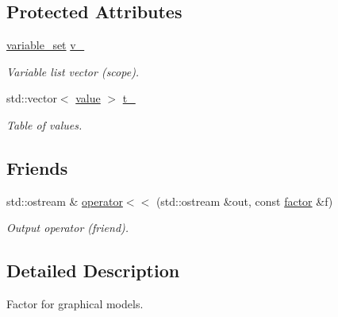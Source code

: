 \subsection*{Protected Attributes}
\begin{DoxyCompactItemize}
\item 
\hyperlink{classmerlin_1_1variable__set}{variable\+\_\+set} \hyperlink{classmerlin_1_1factor_a26c12d26a74f9bf173cc231bee6c5d31}{v\+\_\+}\hypertarget{classmerlin_1_1factor_a26c12d26a74f9bf173cc231bee6c5d31}{}\label{classmerlin_1_1factor_a26c12d26a74f9bf173cc231bee6c5d31}

\begin{DoxyCompactList}\small\item\em Variable list vector ({\itshape scope}). \end{DoxyCompactList}\item 
std\+::vector$<$ \hyperlink{classmerlin_1_1factor_a1b14d19e509403448fbef26b003c9281}{value} $>$ \hyperlink{classmerlin_1_1factor_a326ce3e061b41e7b77eb43aba23ba8fa}{t\+\_\+}\hypertarget{classmerlin_1_1factor_a326ce3e061b41e7b77eb43aba23ba8fa}{}\label{classmerlin_1_1factor_a326ce3e061b41e7b77eb43aba23ba8fa}

\begin{DoxyCompactList}\small\item\em Table of values. \end{DoxyCompactList}\end{DoxyCompactItemize}
\subsection*{Friends}
\begin{DoxyCompactItemize}
\item 
std\+::ostream \& \hyperlink{classmerlin_1_1factor_a030ca98ccee857e9de2af97fcf05b410}{operator$<$$<$} (std\+::ostream \&out, const \hyperlink{classmerlin_1_1factor}{factor} \&f)
\begin{DoxyCompactList}\small\item\em Output operator (friend). \end{DoxyCompactList}\end{DoxyCompactItemize}


\subsection{Detailed Description}
Factor for graphical models. 

